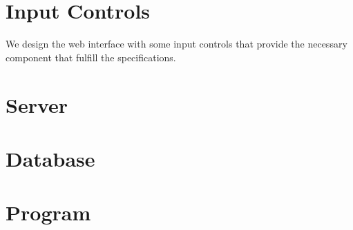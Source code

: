 \section{Input Controls}
We design the web interface with some input controls that provide the necessary component that fulfill the specifications. 

\section{Server}
\section{Database}
\section{Program}

